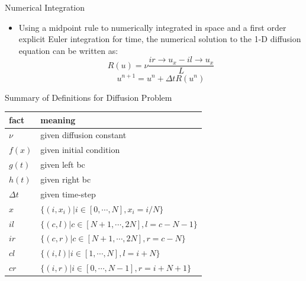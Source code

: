 \documentclass{beamer}
\begin{document}
\begin{frame}{Numerical Integration}
\begin{itemize}
\item Using a midpoint rule to numerically integrated in space and a first order explicit Euler integration for time, the numerical solution to the 1-D diffusion equation can be written as:
\begin{equation*}
R(u) = \nu \frac{{ir \rightarrow u_x - il \rightarrow u_x} }{L}
\end{equation*}
\begin{equation*}
u^{n+1} = u^{n} + \Delta t R(u^n)
\end{equation*}
\end{itemize}
\end{frame}

\begin{frame}{Summary of Definitions for Diffusion Problem}
\begin{center}
  \begin{tabular}{|l|l|}
    \hline
    fact      & meaning \\
    \hline
    $\nu$     & given diffusion constant  \\
    $f(x)$     & given initial condition  \\
    $g(t)$     & given left bc \\
    $h(t)$     & given right bc  \\
    $\Delta t$& given time-step  \\
    $x$       & $\lbrace (i,x_i) | i \in [0, \cdots, N], x_i = i/N    \rbrace$\\
    $il$      & $\lbrace (c,l)   | c \in [N+1, \cdots, 2N], l = c-N-1 \rbrace$\\
    $ir$      & $\lbrace (c,r)   | c \in [N+1, \cdots, 2N], r = c-N   \rbrace$\\
    $cl$      & $\lbrace (i,l)   | i \in [1, \cdots, N], l = i+N      \rbrace$\\
    $cr$      & $\lbrace (i,r)   | i \in [0, \cdots, N-1], r = i+N+1  \rbrace$\\
    \hline
  \end{tabular}
\end{center}
\end{frame}
\end{document}
